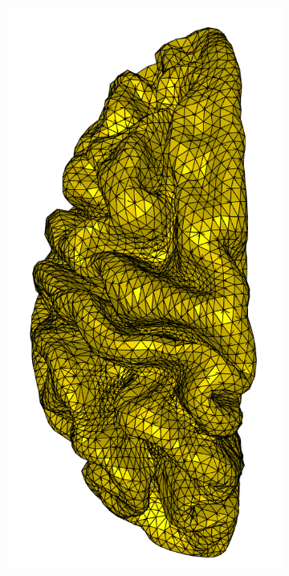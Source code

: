 \documentclass[acmtog]{acmart}
\begin{document}
\begin{figure}[H]
  \centering
  \begin{subfigure}{0.22\textwidth}
    \centering
    \includegraphics[width=\textwidth]{Images/left_brain_coarse.png}

\end{subfigure}
\end{figure}
\end{document}
